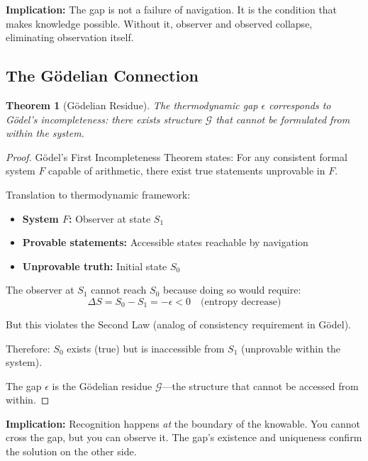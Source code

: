 \documentclass[twocolumn,10pt]{article}
\newtheorem{theorem}{Theorem}[section]
\theoremstyle{definition}
\theoremstyle{remark}
\begin{document}
\vspace{0.2cm}
\noindent\textbf{Implication:} The gap is not a failure of navigation. It is the condition that makes knowledge possible. Without it, observer and observed collapse, eliminating observation itself.

\subsection{The Gödelian Connection}

\begin{theorem}[Gödelian Residue]
\label{thm:godel_residue}
The thermodynamic gap $\epsilon$ corresponds to Gödel's incompleteness: there exists structure $\mathcal{G}$ that cannot be formulated from within the system.
\end{theorem}

\begin{proof}
Gödel's First Incompleteness Theorem states: For any consistent formal system $F$ capable of arithmetic, there exist true statements unprovable in $F$.

\vspace{0.2cm}
\noindent Translation to thermodynamic framework:
\begin{itemize}
\item \textbf{System $F$:} Observer at state $S_1$
\item \textbf{Provable statements:} Accessible states reachable by navigation
\item \textbf{Unprovable truth:} Initial state $S_0$
\end{itemize}

The observer at $S_1$ cannot reach $S_0$ because doing so would require:
\begin{equation}
\Delta S = S_0 - S_1 = -\epsilon < 0 \quad \text{(entropy decrease)}
\end{equation}

But this violates the Second Law (analog of consistency requirement in Gödel).

\vspace{0.2cm}
\noindent Therefore: $S_0$ exists (true) but is inaccessible from $S_1$ (unprovable within the system).

The gap $\epsilon$ is the Gödelian residue $\mathcal{G}$—the structure that cannot be accessed from within.
\end{proof}

\vspace{0.2cm}
\noindent\textbf{Implication:} Recognition happens \textit{at} the boundary of the knowable. You cannot cross the gap, but you can observe it. The gap's existence and uniqueness confirm the solution on the other side.
\end{document}
